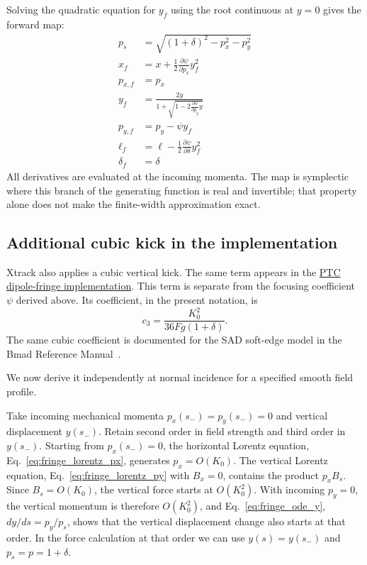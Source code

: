 Solving the quadratic equation for $y_f$ using the root continuous at $y=0$
gives the forward map:
\begin{equation}
\begin{aligned}
p_s &= \sqrt{(1+\delta)^2 - p_x^2 - p_y^2}\\
x_f &= x + \frac{1}{2} \frac{\partial \psi}{\partial p_x} y_f^2 \\
p_{x,f} &= p_x \\
y_f &= \frac{2y}{1 + \sqrt{1 - 2 \frac{\partial \psi}{\partial p_y} y}} \\
p_{y,f} &= p_y - \psi y_f \\
\ell_f &= \ell - \frac{1}{2} \frac{\partial \psi}{\partial \delta} y_f^2 \\
\delta_f &= \delta
\end{aligned}
\label{eq:fringe_map}
\end{equation}
All derivatives are evaluated at the incoming momenta. The map is symplectic where this branch
of the generating function is real and invertible; that property alone does
not make the finite-width approximation exact.

\subsection{Additional cubic kick in the implementation}
\label{sec:fringe_cubic_extension}

Xtrack also applies a cubic vertical kick. The same term appears in the
\href{https://github.com/MethodicalAcceleratorDesign/MAD-X/blob/master/libs/ptc/src/Sh_def_kind.f90}{PTC dipole-fringe implementation}.
This term is separate from the focusing coefficient $\psi$ derived above.
Its coefficient, in the present notation, is
\begin{equation}
 c_3=\frac{K_0^2}{36Fg(1+\delta)}.
 \label{eq:fringe_cubic_coefficient}
\end{equation}
The same cubic coefficient is documented for the SAD soft-edge model in
the Bmad Reference Manual~\cite{Sagan:BmadManual}.

We now derive it independently at normal incidence for a specified smooth
field profile.

Take incoming mechanical momenta $p_x(s_-)=p_y(s_-)=0$ and vertical displacement
$y(s_-)$. Retain second order in field strength and third order in $y(s_-)$.
Starting from $p_x(s_-)=0$, the horizontal Lorentz equation,
Eq.~\eqref{eq:fringe_lorentz_px}, generates $p_x=O(K_0)$.
The vertical Lorentz equation, Eq.~\eqref{eq:fringe_lorentz_py} with $B_x=0$,
contains the product $p_x B_s$. Since $B_s=O(K_0)$, the vertical force
starts at $O(K_0^2)$. With incoming $p_y=0$, the vertical momentum is
therefore $O(K_0^2)$, and Eq.~\eqref{eq:fringe_ode_y}, $dy/ds=p_y/p_s$,
shows that the vertical displacement change also starts at that order.
In the force calculation at that order we can use $y(s)=y(s_-)$
and $p_s=p=1+\delta$.

